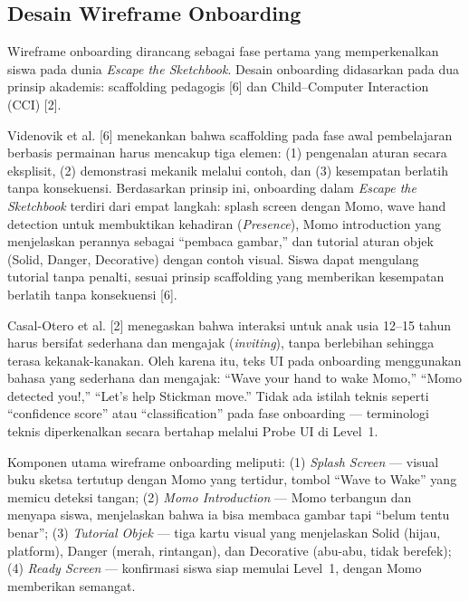 \documentclass[12pt,oneside]{report}
\begin{document}
\subsection{Desain Wireframe Onboarding}
\label{subsec:wireframe-onboarding}

Wireframe onboarding dirancang sebagai fase pertama yang memperkenalkan siswa pada dunia \textit{Escape the Sketchbook}. Desain onboarding didasarkan pada dua prinsip akademis: scaffolding pedagogis [6] dan Child--Computer Interaction (CCI) [2].

Videnovik et al. [6] menekankan bahwa scaffolding pada fase awal pembelajaran berbasis permainan harus mencakup tiga elemen: (1) pengenalan aturan secara eksplisit, (2) demonstrasi mekanik melalui contoh, dan (3) kesempatan berlatih tanpa konsekuensi. Berdasarkan prinsip ini, onboarding dalam \textit{Escape the Sketchbook} terdiri dari empat langkah: splash screen dengan Momo, wave hand detection untuk membuktikan kehadiran (\textit{Presence}), Momo introduction yang menjelaskan perannya sebagai ``pembaca gambar,'' dan tutorial aturan objek (Solid, Danger, Decorative) dengan contoh visual. Siswa dapat mengulang tutorial tanpa penalti, sesuai prinsip scaffolding yang memberikan kesempatan berlatih tanpa konsekuensi [6].

Casal-Otero et al. [2] menegaskan bahwa interaksi untuk anak usia 12--15 tahun harus bersifat sederhana dan mengajak (\textit{inviting}), tanpa berlebihan sehingga terasa kekanak-kanakan. Oleh karena itu, teks UI pada onboarding menggunakan bahasa yang sederhana dan mengajak: ``Wave your hand to wake Momo,'' ``Momo detected you!,'' ``Let's help Stickman move.'' Tidak ada istilah teknis seperti ``confidence score'' atau ``classification'' pada fase onboarding --- terminologi teknis diperkenalkan secara bertahap melalui Probe UI di Level~1.

Komponen utama wireframe onboarding meliputi: (1) \textit{Splash Screen} --- visual buku sketsa tertutup dengan Momo yang tertidur, tombol ``Wave to Wake'' yang memicu deteksi tangan; (2) \textit{Momo Introduction} --- Momo terbangun dan menyapa siswa, menjelaskan bahwa ia bisa membaca gambar tapi ``belum tentu benar''; (3) \textit{Tutorial Objek} --- tiga kartu visual yang menjelaskan Solid (hijau, platform), Danger (merah, rintangan), dan Decorative (abu-abu, tidak berefek); (4) \textit{Ready Screen} --- konfirmasi siswa siap memulai Level~1, dengan Momo memberikan semangat.
\end{document}
